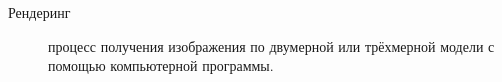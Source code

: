 \Defines %
\begin{description}
	
	\item[Рендеринг] процесс получения изображения по двумерной или трёхмерной модели 
	с помощью компьютерной программы.%
	
	
	
	
\end{description}

